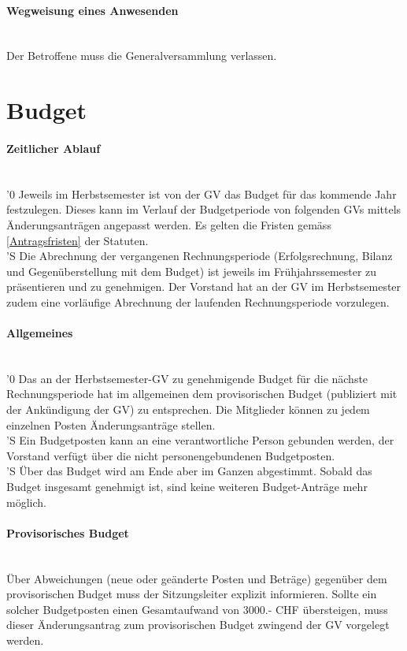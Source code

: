 \documentclass[a4paper,11pt]{article}
\newcommand{\nl}{\\[1.5ex]}
\begin{document}
\paragraph{Wegweisung eines Anwesenden} \ \\
Der Betroffene muss die Generalversammlung verlassen.


\section*{Budget}

\paragraph{Zeitlicher Ablauf} \ \\
'0 Jeweils im Herbstsemester ist von der GV das Budget für das kommende Jahr festzulegen. Dieses kann im Verlauf der Budgetperiode von folgenden GVs mittels Änderungsanträgen angepasst werden. Es gelten die Fristen gemäss \ref{Antragsfristen} der Statuten.\nl
'S Die Abrechnung der vergangenen Rechnungsperiode (Erfolgsrechnung, Bilanz und Gegenüberstellung mit dem Budget) ist jeweils im Frühjahrssemester zu präsentieren und zu genehmigen. Der Vorstand hat an der GV im Herbstsemester zudem eine vorläufige Abrechnung der laufenden Rechnungsperiode vorzulegen.

\paragraph{Allgemeines} \ \\
'0 Das an der Herbstsemester-GV zu genehmigende Budget für die nächste Rechnungsperiode hat im allgemeinen dem provisorischen Budget (publiziert mit der Ankündigung der GV) zu entsprechen. Die Mitglieder können zu jedem einzelnen Posten Änderungsanträge stellen. \nl
'S Ein Budgetposten kann an eine verantwortliche Person gebunden werden, der Vorstand verfügt über die nicht personengebundenen Budgetposten. \nl
'S Über das Budget wird am Ende aber im Ganzen abgestimmt. Sobald das Budget insgesamt genehmigt ist, sind keine weiteren Budget-Anträge mehr möglich.


\paragraph{Provisorisches Budget} \ \\
Über Abweichungen (neue oder geänderte Posten und Beträge) gegenüber dem provisorischen Budget muss der Sitzungsleiter explizit informieren. Sollte ein solcher Budgetposten einen Gesamtaufwand von 3000.- CHF übersteigen, muss dieser Änderungsantrag zum provisorischen Budget zwingend der GV vorgelegt werden.
\end{document}
